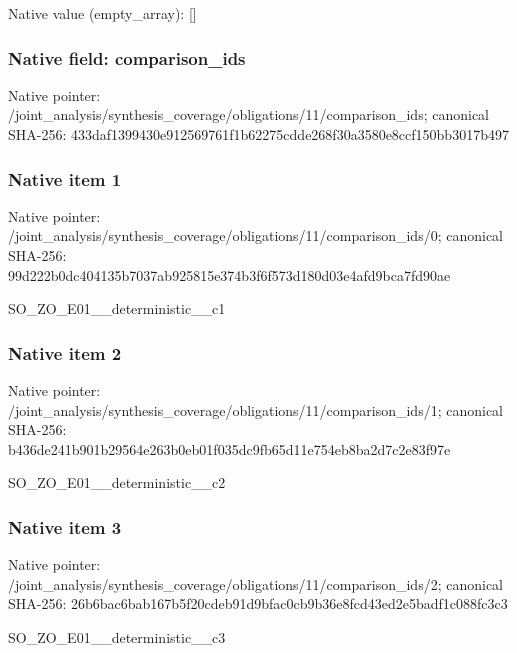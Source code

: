 \documentclass[10pt,a4paper]{article}
\begin{document}
Native value (empty\_\allowbreak{}array): []

\subsubsection{Native field: comparison\_\allowbreak{}ids}
Native pointer: /joint\_\allowbreak{}analysis/synthesis\_\allowbreak{}coverage/obligations/11/comparison\_\allowbreak{}ids; canonical SHA-256: 433daf1399430e912569761f1b62275cdde268f30a3580e8ccf150bb3017b497

\subsubsection{Native item 1}
Native pointer: /joint\_\allowbreak{}analysis/synthesis\_\allowbreak{}coverage/obligations/11/comparison\_\allowbreak{}ids/0; canonical SHA-256: 99d222b0dc404135b7037ab925815e374b3f6f573d180d03e4afd9bca7fd90ae

\begingroup\raggedright\sloppy SO\_\allowbreak{}ZO\_\allowbreak{}E01\_\allowbreak{}\_\allowbreak{}deterministic\_\allowbreak{}\_\allowbreak{}c1\par\endgroup

\subsubsection{Native item 2}
Native pointer: /joint\_\allowbreak{}analysis/synthesis\_\allowbreak{}coverage/obligations/11/comparison\_\allowbreak{}ids/1; canonical SHA-256: b436de241b901b29564e263b0eb01f035dc9fb65d11e754eb8ba2d7c2e83f97e

\begingroup\raggedright\sloppy SO\_\allowbreak{}ZO\_\allowbreak{}E01\_\allowbreak{}\_\allowbreak{}deterministic\_\allowbreak{}\_\allowbreak{}c2\par\endgroup

\subsubsection{Native item 3}
Native pointer: /joint\_\allowbreak{}analysis/synthesis\_\allowbreak{}coverage/obligations/11/comparison\_\allowbreak{}ids/2; canonical SHA-256: 26b6bac6bab167b5f20cdeb91d9bfac0cb9b36e8fcd43ed2e5badf1c088fc3c3

\begingroup\raggedright\sloppy SO\_\allowbreak{}ZO\_\allowbreak{}E01\_\allowbreak{}\_\allowbreak{}deterministic\_\allowbreak{}\_\allowbreak{}c3\par\endgroup
\end{document}
